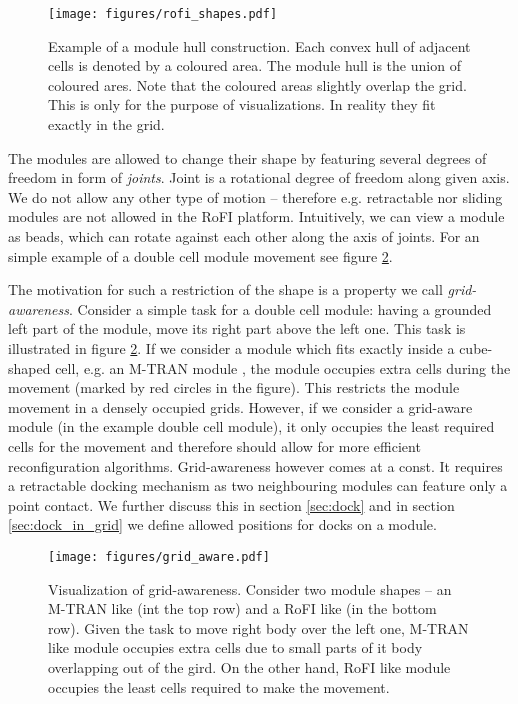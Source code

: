 \begin{figure}[h!]
    \centering
    \texttt{[image: figures/rofi\_shapes.pdf]}
    \caption{Example of a module hull construction. Each convex hull of adjacent
    cells is denoted by a coloured area. The module hull is the union of coloured
    ares. Note that the coloured areas slightly overlap the grid. This is only
    for the purpose of visualizations. In reality they fit exactly in the grid.}
    \label{fig:rofi_shapes}
\end{figure}

The modules are allowed to change their shape by featuring several degrees of
freedom in form of \emph{joints}. Joint is a rotational degree of freedom along
given axis. We do not allow any other type of motion -- therefore e.g.
retractable nor sliding modules are not allowed in the RoFI platform.
Intuitively, we can view a module as beads, which can rotate against each other
along the axis of joints. For an simple example of a double cell module movement
see figure \ref{fig:grid_aware}.

The motivation for such a restriction of the shape is a property we call
\emph{grid-awareness}. Consider a simple task for a double cell module: having a
grounded left part of the module, move its right part above the left one. This
task is illustrated in figure \ref{fig:grid_aware}. If we consider a module
which fits exactly inside a cube-shaped cell, e.g. an M-TRAN module
\cite{haruhisa_kurokawa_m-tran_2003}, the module occupies extra cells during the
movement (marked by red circles in the figure). This restricts the module
movement in a densely occupied grids. However, if we consider a grid-aware
module (in the example double cell module), it only occupies the least required
cells for the movement and therefore should allow for more efficient
reconfiguration algorithms. Grid-awareness however comes at a const. It requires
a retractable docking mechanism as two neighbouring modules can feature only a
point contact. We further discuss this in section \ref{sec:dock} and in section
\ref{sec:dock_in_grid} we define allowed positions for docks on a module.

\begin{figure}[h!]
    \centering
    \texttt{[image: figures/grid\_aware.pdf]}
    \caption{Visualization of grid-awareness. Consider two module shapes -- an
    M-TRAN\cite{haruhisa_kurokawa_m-tran_2003} like (int the top row) and a RoFI
    like (in the bottom row). Given the task to move right body over the left
    one, M-TRAN like module occupies extra cells due to small parts of it body
    overlapping out of the gird. On the other hand, RoFI like module occupies
    the least cells required to make the movement. }
    \label{fig:grid_aware}
\end{figure}

